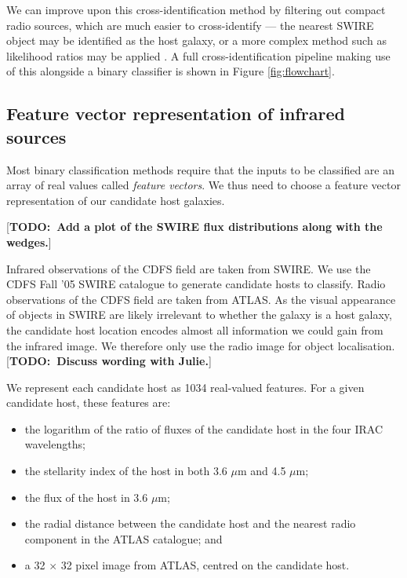 \documentclass[fleqn,usenatbib,usedcolumn]{mnras}
\newcommand{\todo}[1]{ {\color{red}[{\bf TODO:~{#1}}]} }
\begin{document}
    We can improve upon this cross-identification method by filtering out
    compact radio sources, which are much easier to cross-identify --- the
    nearest SWIRE object may be identified as the host galaxy, or a more
    complex method such as likelihood ratios may be applied
    \citep[see][]{weston17}. A full cross-identification pipeline making use
    of this alongside a binary classifier is shown in Figure
    \ref{fig:flowchart}.

  \subsection{Feature vector representation of infrared sources}
  \label{vector-representation-of-infrared-sources}

    Most binary classification methods require that the inputs to be classified
    are an array of real values called \emph{feature vectors}. We thus need to
    choose a feature vector representation of our candidate host galaxies.

    \todo{Add a plot of the SWIRE flux distributions along with the wedges.}

    Infrared observations of the CDFS field are taken from SWIRE. We use the
    CDFS Fall '05 SWIRE catalogue \citep{surace05swire} to generate candidate
    hosts to classify. Radio observations of the CDFS field are taken from
    ATLAS. As the visual appearance of objects in SWIRE are likely irrelevant to
    whether the galaxy is a host galaxy, the candidate host location encodes
    almost all information we could gain from the infrared image. We therefore
    only use the radio image for object localisation. \todo{Discuss wording with
    Julie.}

    We represent each candidate host as 1034 real-valued features. For a given
    candidate host, these features are:
    \begin{itemize}
      \item the logarithm of the ratio of fluxes of the candidate host in the
        four IRAC wavelengths;
      \item the stellarity index of the host in both 3.6 $\mu$m and 4.5
        $\mu$m;
      \item the flux of the host in 3.6 $\mu$m;
      \item the radial distance between the candidate host and the nearest
        radio component in the ATLAS catalogue; and
      \item a 32 $\times$ 32 pixel image from ATLAS, centred on the candidate
        host.
    \end{itemize}
\end{document}
